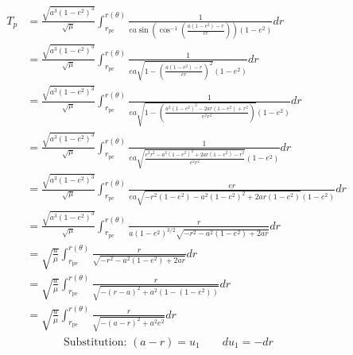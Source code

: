 \documentclass{article}
\begin{document}
\begin{align*}
    T_p & =\frac{\sqrt{a^3(1-e^2)^3}}{\sqrt{\mu}}\int_{r_\text{pe}}^{r(\theta)}\frac{1}{ea\sin\left(\cos^{-1}\left(\frac{a(1-e^2)-r}{er}\right)\right)(1-e^2)}dr                                                         \\
        & =\frac{\sqrt{a^3(1-e^2)^3}}{\sqrt{\mu}}\int_{r_\text{pe}}^{r(\theta)}\frac{1}{ea\sqrt{1-\left(\frac{a(1-e^2)-r}{er}\right)^2}(1-e^2)}dr                                                                        \\
        & =\frac{\sqrt{a^3(1-e^2)^3}}{\sqrt{\mu}}\int_{r_\text{pe}}^{r(\theta)}\frac{1}{ea\sqrt{1-\left(\frac{a^2(1-e^2)^2-2ar(1-e^2)+r^2}{e^2r^2}\right)}(1-e^2)}dr                                                     \\
        & =\frac{\sqrt{a^3(1-e^2)^3}}{\sqrt{\mu}}\int_{r_\text{pe}}^{r(\theta)}\frac{1}{ea\sqrt{\frac{e^2r^2-a^2(1-e^2)^2+2ar(1-e^2)-r^2}{e^2r^2}}(1-e^2)}dr                                                             \\
        & =\frac{\sqrt{a^3(1-e^2)^3}}{\sqrt{\mu}}\int_{r_\text{pe}}^{r(\theta)}\frac{er}{ea\sqrt{-r^2(1-e^2)-a^2(1-e^2)^2+2ar(1-e^2 )}(1-e^2)}dr                                                                         \\
        & =\frac{\sqrt{a^3(1-e^2)^3}}{\sqrt{\mu}}\int_{r_\text{pe}}^{r(\theta)}\frac{r}{a(1-e^2)^{3/2}\sqrt{-r^2-a^2(1-e^2)+2ar}}dr                                                                                      \\
        & =\sqrt{\frac{a}{\mu}}\int_{r_\text{pe}}^{r(\theta)}\frac{r}{\sqrt{-r^2-a^2(1-e^2)+2ar}}dr                                                                                                                      \\
        & =\sqrt{\frac{a}{\mu}}\int_{r_\text{pe}}^{r(\theta)}\frac{r}{\sqrt{-(r-a)^2+a^2(1-(1-e^2))}}dr                                                                                                                  \\
        & =\sqrt{\frac{a}{\mu}}\int_{r_\text{pe}}^{r(\theta)}\frac{r}{\sqrt{-(a-r)^2+a^2e^2}}dr                                                                                                                          \\
        & \phantom{=}\qquad{}\text{Substitution: }(a-r)=u_1\qquad{}du_1=-dr                                                                                                                                              \\

\end{align*}
\end{document}
